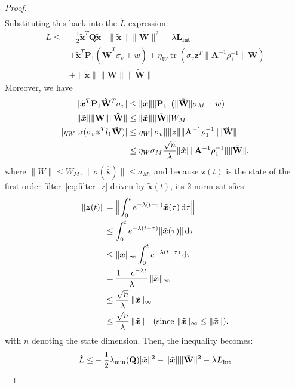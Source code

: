 \documentclass[10pt,twocolumn]{ICCAS}
\newcommand{\tr}{\operatorname{tr}}
\newcommand{\xtilde}{\tilde{\bm{x}}}
\newcommand{\xhatbar}{\hat{\bar{\bm{x}}}}
\newcommand{\Wtilde}{\tilde{\mathbf{W}}}
\newcommand{\What}{\hat{\mathbf{W}}}
\begin{document}
\begin{proof}
\begin{align*}
\end{align*}
Substituting this back into the $\dot{L}$ expression:
\begin{align*}
    \dot{L} \le &-\frac{1}{2}\xtilde^T{\mathbf{Q}}\xtilde  -\|\xtilde\| \|\Wtilde\|^{2} - \lambda \bm{ L_{\text{int}}} \\
    & + \xtilde^T{\mathbf{P}_{1}} (\Wtilde^T \sigma_v + w) + \eta_W \tr(\sigma_v {\bm{z}^T} \|{\mathbf{A}^{-1}} \rho_1^{-1}\| \Wtilde) \\
    &+  \|\xtilde\| \|\mathbf{W}\|\|\Wtilde\|
\end{align*}
Moreover, we have
\begin{align*}
    |\xtilde^T\mathbf{P}_1 \Wtilde^T \sigma_v| &\le \|\xtilde\|\|\mathbf{P}_1\|(\|\Wtilde\| \sigma_{M} + \bar{w})\\
    \|\xtilde\| \|\bf{W}\|\|\What\| &\le \|\xtilde\|\|\Wtilde\| W_M \\
        |\eta_W \tr(\sigma_v \bm{z}^T l_1 \Wtilde)|
    &\le \eta_W \|\sigma_v\| \|\bm{z}\| \|{\mathbf{A}^{-1}} \rho_1^{-1}\| \|\Wtilde\| \\
    &\le \eta_W \sigma_M \frac{\sqrt{n}}{\lambda} \|\xtilde\| \|{\mathbf{A}^{-1}} \rho_1^{-1}\| \|\Wtilde\|.
\end{align*}
where $\|W\|\le W_M$, $\|\sigma(\xhatbar)\|\le \sigma_M$, and
because $\bm z(t)$ is the state of the first-order filter~\eqref{eq:filter_z}
driven by $\xtilde(t)$, its 2-norm satisfies
\begin{align*}
    \|\bm z(t)\|
    &= \Bigl\| \int_{0}^{t} e^{-\lambda(t-\tau)} \xtilde(\tau)\,\mathrm d\tau \Bigr\| \notag\\
    &\le \int_{0}^{t} e^{-\lambda(t-\tau)} \|\xtilde(\tau)\|\,\mathrm d\tau \notag\\
    &\le \|\xtilde\|_{\infty} \int_{0}^{t} e^{-\lambda(t-\tau)}\,\mathrm d\tau \notag\\
    &= \frac{1-e^{-\lambda t}}{\lambda}\,\|\xtilde\|_{\infty} \notag\\
    &\le \frac{\sqrt{n}}{\lambda}\,\|\xtilde\|_{\infty} \notag\\
    &\le \frac{\sqrt{n}}{\lambda}\,\|\xtilde\| \quad (\text{since } \|\xtilde\|_{\infty}\le\|\xtilde\|).
\end{align*}
with $n$ denoting the state dimension. Then, the inequality becomes:
\begin{align*}
    \dot{L} \le 
    & -\frac{1}{2}\lambda_{\min}({\mathbf{Q}})|\xtilde\|^2 - \|\xtilde\|\|\Wtilde\|^2 - \lambda \bm{L_{\text{int}}} \notag \\

\end{align*}
\end{proof}
\end{document}

